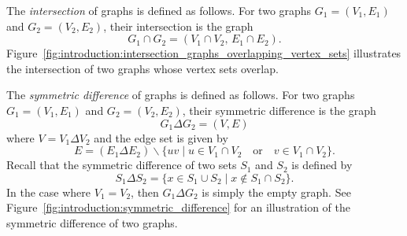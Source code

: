The \emph{intersection} of graphs is defined as follows. For two
graphs $G_1 = (V_1, E_1)$ and $G_2 = (V_2, E_2)$, their intersection
is the graph
\[
G_1 \cap G_2
=
(V_1 \cap V_2,\, E_1 \cap E_2).
\]
Figure~\ref{fig:introduction:intersection_graphs_overlapping_vertex_sets}
illustrates the intersection of two graphs whose vertex sets overlap.

The \emph{symmetric difference} of graphs is defined as follows. For
two graphs $G_1 = (V_1, E_1)$ and $G_2 = (V_2, E_2)$, their symmetric
difference is the graph
\[
G_1 \Delta G_2
=
(V, E)
\]
where $V = V_1 \Delta V_2$ and the edge set is given by
\[
E
=
(E_1 \Delta E_2) \backslash
\{
uv \;|\; u \in V_1 \cap V_2 \quad\text{or}\quad v \in V_1 \cap V_2
\}.
\]
Recall that the symmetric difference of two sets $S_1$ and $S_2$ is
defined by
\[
S_1 \Delta S_2
=
\{x \in S_1 \cup S_2 \;|\; x \notin S_1 \cap S_2\}.
\]
In the case where $V_1 = V_2$, then $G_1 \Delta G_2$ is simply the
empty graph. See Figure~\ref{fig:introduction:symmetric_difference}
for an illustration of the symmetric difference of two graphs.
\index{$\Delta$}

